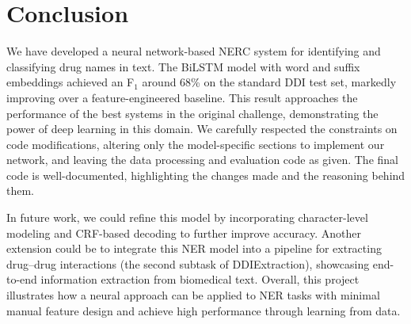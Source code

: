 \section{Conclusion}
We have developed a neural network-based NERC system for identifying and classifying drug names in text. The BiLSTM model with word and suffix embeddings achieved an F$_1$ around 68\% on the standard DDI test set, markedly improving over a feature-engineered baseline. This result approaches the performance of the best systems in the original challenge, demonstrating the power of deep learning in this domain. We carefully respected the constraints on code modifications, altering only the model-specific sections to implement our network, and leaving the data processing and evaluation code as given. The final code is well-documented, highlighting the changes made and the reasoning behind them.

In future work, we could refine this model by incorporating character-level modeling and CRF-based decoding to further improve accuracy. Another extension could be to integrate this NER model into a pipeline for extracting drug--drug interactions (the second subtask of DDIExtraction), showcasing end-to-end information extraction from biomedical text. Overall, this project illustrates how a neural approach can be applied to NER tasks with minimal manual feature design and achieve high performance through learning from data.